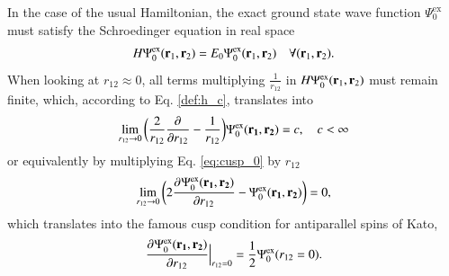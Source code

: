 \documentclass[aip,jcp,reprint,noshowkeys,superscriptaddress,twocolumn]{revtex4-1}
\newcommand{\deriv}[3]{\frac{\partial^{#3} #1}{\partial {#2}^{#3}}}
\newcommand{\bd}[1]{{\bf {#1}}}
\newcommand{\br}[0]{{\bf {r}}}
\newcommand{\psiex}[0]{\Psi^{\text{ex}}_0}
\begin{document}
In the case of the usual Hamiltonian, the exact ground state wave function $\psiex$ must satisfy the Schroedinger equation in real space 
\begin{equation}
 H \psiex(\br{}_1,\br{}_2) = E_0 \psiex(\br{}_1,\br{}_2)\quad \forall (\br{}_1,\br{}_2).
\end{equation}
When looking at $r_{12}\approx 0$, all terms multiplying $\frac{1}{r_{12}}$ in $H \psiex(\br{}_1,\br{}_2)$ must remain finite, which, according to Eq. \eqref{def:h_c}, translates into
\begin{equation}
 \label{eq:cusp_0}
 \lim_{r_{12}\rightarrow 0}\bigg( \frac{2}{r_{12}} \deriv{}{r_{12}}{} -\frac{1}{r_{12}}\bigg) \psiex(\bd{r_1},\bd{r_2})  = c,\quad c<\infty 
\end{equation}
or equivalently by multiplying Eq. \eqref{eq:cusp_0} by $r_{12}$
\begin{equation}
 \lim_{r_{12}\rightarrow 0}\bigg( 2 \deriv{\psiex(\bd{r_1},\bd{r_2})}{r_{12}}{} -\psiex(\bd{r_1},\bd{r_2}) \bigg) = 0, 
\end{equation}
which translates into the famous cusp condition for antiparallel spins of Kato\cite{Kat-CPAM-57}, 
\begin{equation}
 \deriv{\psiex(\bd{r_1},\bd{r_2})}{r_{12}}{}\Bigr|_{r_{12}=0} = \frac{1}{2} \psiex(r_{12}=0). 
\end{equation} 
\end{document}
